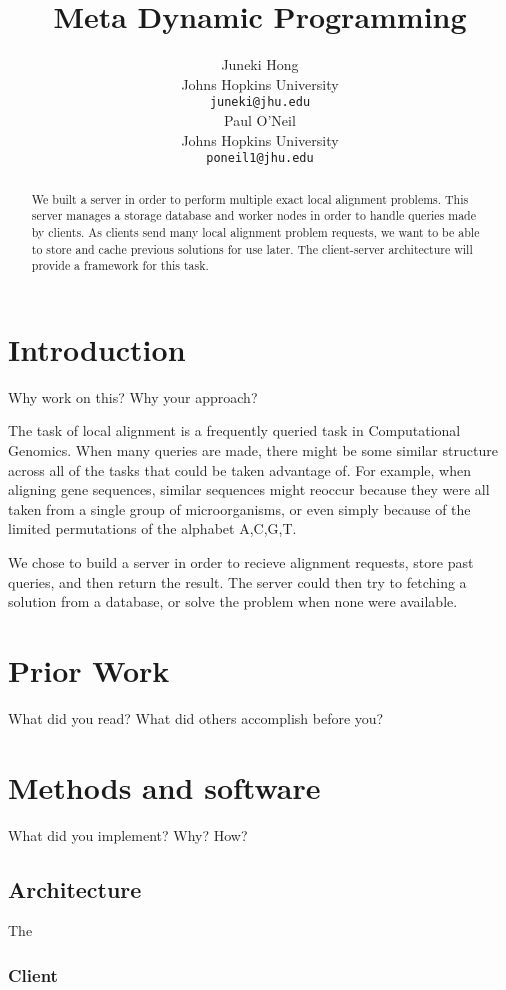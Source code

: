 \documentclass[11pt]{article}
\title{Meta Dynamic Programming}
\author{Juneki Hong \\
  Johns Hopkins University \\
  {\tt juneki@jhu.edu} \\\And
  Paul O'Neil \\
  Johns Hopkins University \\
  {\tt poneil1@jhu.edu} \\}
\date{}
\begin{document}
\maketitle
\begin{abstract}
  We built a server in order to perform multiple exact local alignment problems. This server manages a storage database and worker nodes in order to handle queries made by clients. As clients send many local alignment problem requests, we want to be able to store and cache previous solutions for use later. The client-server architecture will provide a framework for this task. 
\end{abstract}


\section{Introduction}
Why work on this? Why your approach?

The task of local alignment is a frequently queried task in Computational Genomics. When many queries are made, there might be some similar structure across all of the tasks that could be taken advantage of. For example, when aligning gene sequences, similar sequences might reoccur because they were all taken from a single group of microorganisms, or even simply because of the limited permutations of the alphabet A,C,G,T. 

We chose to build a server in order to recieve alignment requests, store past queries, and then return the result. The server could then try to fetching a solution from a database, or solve the problem when none were available.
 



\section{Prior Work}
 What did you read? What did others accomplish before you?


\section{Methods and software}

What did you implement? Why? How?

\subsection{Architecture}
The 

\subsubsection{Client}
\end{document}
